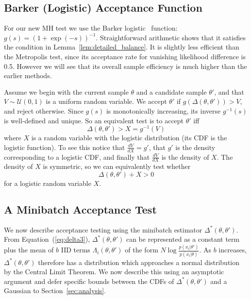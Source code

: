 \documentclass[twoside]{article} \usepackage{aistats2017}
\begin{document}
\subsection{Barker (Logistic) Acceptance Function}\label{ssec:barker_function}
For our new MH test we use the Barker logistic~\citep{Barker65}
function: $g(s)=(1+\exp(-s))^{-1}$. Straightforward arithmetic shows
that it satisfies the condition in Lemma~\ref{lem:detailed_balance}.
It is slightly less efficient than the Metropolis test, since its
acceptance rate for vanishing likelihood difference is 0.5. However we
will see that its overall sample efficiency is much higher than the
earlier methods.

Assume we begin with the current sample $\theta$ and a candidate sample
$\theta'$, and that $V \sim \mathcal{U}(0,1)$ is a uniform random variable. We
accept $\theta'$ if $g(\Delta(\theta,\theta')) > V$, and reject otherwise.
Since $g(s)$ is monotonically increasing, its inverse $g^{-1}(s)$ is
well-defined and unique. So an equivalent test is to accept $\theta'$ iff
\begin{equation}\label{eq:equivalent_test}
    \Delta(\theta,\theta') > X = g^{-1}(V)
\end{equation}
where $X$ is a random variable with the logistic distribution (its CDF is the
logistic function). To see this notice that $\frac{dV}{dX} = g'$, that $g'$ is
the density corresponding to a logistic CDF, and finally that $\frac{dV}{dX}$ is
the density of $X$. The density of $X$ is symmetric, so we can equivalently test
whether
\begin{equation}\label{eq:the_exact_test}
    \Delta(\theta,\theta') + X > 0
\end{equation}
for a logistic random variable $X$.


\subsection{A Minibatch Acceptance Test}\label{ssec:deltas_minibatch}

We now describe acceptance testing using the minibatch estimator
$\Delta^*(\theta,\theta')$. From Equation~(\ref{eq:delta3}),
$\Delta^*(\theta,\theta')$ can be represented as a constant term plus the mean
of $b$ IID terms $\Lambda_i(\theta,\theta')$ of the form
$N\log\frac{p(x_i|\theta')}{p(x_i|\theta)}$. As $b$ increases,
$\Delta^*(\theta,\theta')$ therefore has a distribution which approaches a
normal distribution by the Central Limit Theorem. We now describe this using an
asymptotic argument and defer specific bounds between the CDFs of
$\Delta^*(\theta,\theta')$ and a Gaussian to Section~\ref{sec:analysis}.
\end{document}
